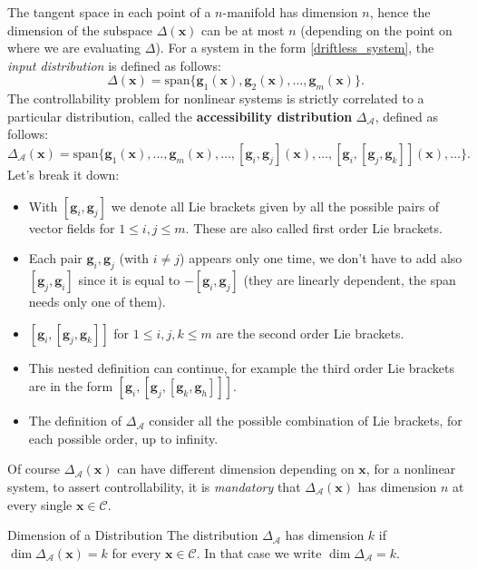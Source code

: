 \documentclass[10pt, a4paper]{report}
\begin{document}
The tangent space in each point of a $n$-manifold has dimension $n$, hence the dimension of the subspace $\Delta (\mathbf x)$ can be at most $n$ (depending on the point on where we are evaluating $\Delta$). For a system in the form \eqref{driftless_system}, the \textit{input distribution} is defined as follows:\begin{equation}
    \Delta(\mathbf x)=\text{span}\{\mathbf g_1(\mathbf x),\mathbf g_2(\mathbf x),\dots,\mathbf g_m(\mathbf x)\}.
\end{equation}
The controllability problem for nonlinear systems is strictly correlated to a particular distribution, called the \textbf{accessibility distribution} $\Delta_{\mathcal A}$, defined as follows:\begin{equation}
    \Delta_{\mathcal A}(\mathbf x)=\text{span}\{\mathbf g_1(\mathbf x),\dots,\mathbf g_m(\mathbf x),\dots,[\mathbf g_i,\mathbf g_j](\mathbf x),\dots,[\mathbf g_i,[\mathbf g_j,\mathbf g_k]](\mathbf x),\dots\}.
\end{equation}
Let's break it down:\begin{itemize}
    \item With $[\mathbf g_i,\mathbf g_j]$  we denote all Lie brackets given by all the possible pairs of vector fields for $1\le i,j\le m$. These are also called first order Lie brackets.
    \item Each pair $\mathbf g_i,\mathbf g_j$ (with $i\ne j$) appears only one time, we don't have to add also $[\mathbf g_j,\mathbf g_i]$ since it is equal to $-[\mathbf g_i,\mathbf g_j]$ (they are linearly dependent, the span needs only one of them).
    \item $[\mathbf g_i,[\mathbf g_j,\mathbf g_k]]$ for $1\le i,j,k\le m$ are the second order Lie brackets.
    \item This nested definition can continue, for example the third order Lie brackets are in the form  $[\mathbf g_i,[\mathbf g_j,[\mathbf g_k,\mathbf g_h]]]$.
    \item The definition of $\Delta_{\mathcal A}$ consider all the possible combination of Lie brackets, for each possible order, up to infinity.
\end{itemize}
Of course $\Delta_{\mathcal A}(\mathbf x)$ can have different dimension depending on $\mathbf x$, for a nonlinear system, to assert controllability, it is \textit{mandatory} that $\Delta_{\mathcal A}(\mathbf x)$ has dimension $n$ at every single $\mathbf x\in\mathcal C$.
\begin{boxdefinition}{Dimension of a Distribution}{}
    The distribution $\Delta_{\mathcal A}$ has dimension $k$ if $\dim\Delta_{\mathcal A}(\mathbf x)=k$ for every $\mathbf x\in\mathcal C$. In that case we write $\dim\Delta_{\mathcal A}=k$.
\end{boxdefinition}
\end{document}
